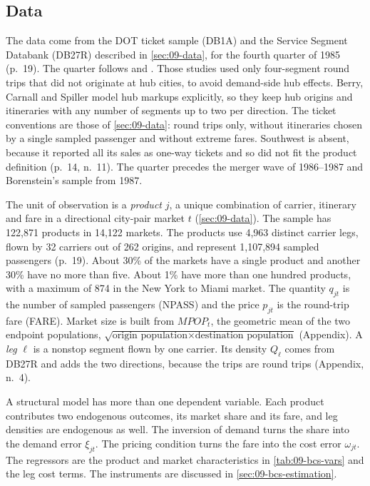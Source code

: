 \subsection{Data}\label{sec:09-bcs-data}

The data come from the DOT ticket sample (DB1A) and the Service Segment Databank (DB27R) described in
\cref{sec:09-data}, for the fourth quarter of 1985 (p.~19). The quarter follows \citet{BruecknerDyerSpiller1992}
and \citet{BruecknerSpiller1994}. Those studies used only four-segment round trips that did not originate at
hub cities, to avoid demand-side hub effects. Berry, Carnall and Spiller model hub markups explicitly, so
they keep hub origins and itineraries with any number of segments up to two per direction. The ticket
conventions are those of \cref{sec:09-data}: round trips only, without itineraries chosen by a single
sampled passenger and without extreme fares. Southwest is absent, because it reported all its sales as one-way
tickets and so did not fit the product definition (p.~14, n.~11). The quarter precedes the merger wave of
1986--1987 and Borenstein's sample from 1987.

The unit of observation is a \emph{product} $j$, a unique combination of carrier, itinerary and fare in a
directional city-pair market $t$ (\cref{sec:09-data}). The sample has 122,871 products in 14,122 markets.
The products use 4,963 distinct carrier legs, flown by 32 carriers out of 262 origins, and represent
1,107,894 sampled passengers (p.~19). About 30\% of the markets have a single product and another 30\% have
no more than five. About 1\% have more than one hundred products, with a maximum of 874 in the New York to
Miami market. The quantity $q_{jt}$ is the number of sampled passengers (NPASS) and the price $p_{jt}$ is
the round-trip fare (FARE). Market size is built from $\mathit{MPOP}_t$, the geometric mean of the two
endpoint populations, $\sqrt{\text{origin population}\times\text{destination population}}$ (Appendix). A
\emph{leg} $\ell$ is a nonstop segment flown by one carrier. Its density $Q_\ell$ comes from DB27R and
adds the two directions, because the trips are round trips (Appendix, n.~4).

A structural model has more than one dependent variable. Each product contributes two endogenous outcomes,
its market share and its fare, and leg densities are endogenous as well. The inversion of demand turns the
share into the demand error $\xi_{jt}$. The pricing condition turns the fare into the cost error
$\omega_{jt}$. The regressors are the product and market characteristics in \cref{tab:09-bcs-vars} and the
leg cost terms. The instruments are discussed in \cref{sec:09-bcs-estimation}.

